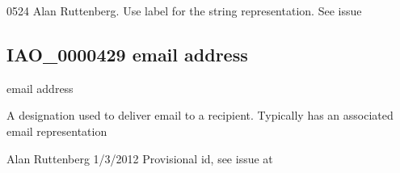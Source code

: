\documentclass[letterpaper,10pt,english]{sphinxmanual}
\begin{document}
\begin{sphinxShadowBox}

\sphinxhyphen{}05\sphinxhyphen{}24 Alan Ruttenberg. Use label for the string representation. See issue 
\end{sphinxShadowBox}

\begin{sphinxShadowBox}

\sphinxAtStartPar
{}
\end{sphinxShadowBox}
\begin{quote}

\ignorespaces \end{quote}


\subsection{IAO\_0000429 \sphinxhyphen{} email address}
\label{\detokenize{doc-IAO_0000429:iao-0000429-email-address}}\label{\detokenize{doc-IAO_0000429:index-0}}\label{\detokenize{doc-IAO_0000429::doc}}
\begin{sphinxShadowBox}

\sphinxAtStartPar
email address
\end{sphinxShadowBox}

\begin{sphinxShadowBox}

\sphinxAtStartPar
A designation used to deliver email to a recipient.  Typically has an associated email representation
\end{sphinxShadowBox}

\begin{sphinxShadowBox}

\sphinxAtStartPar
Alan Ruttenberg 1/3/2012 \sphinxhyphen{} Provisional id, see issue at 
\end{sphinxShadowBox}

\begin{sphinxShadowBox}

\sphinxAtStartPar
{}
\end{sphinxShadowBox}
\end{document}
